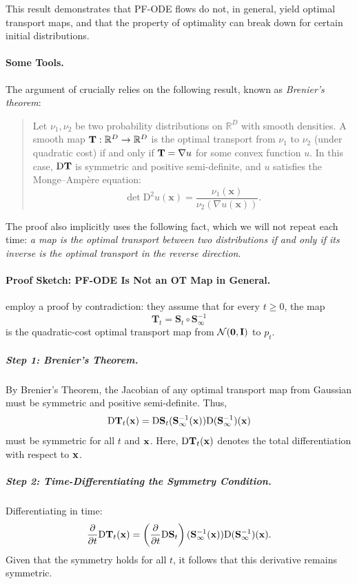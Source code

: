 This result demonstrates that PF-ODE flows do not, in general, yield optimal transport maps, and that the property of optimality can break down for certain initial distributions.

\paragraph{Some Tools.} The argument of \citet{lavenant2022flow} crucially relies on the following result, known as \emph{Brenier's theorem}:
\begin{quote}
    \begin{theorem}\label{thm:brenier}
Let $\nu_1, \nu_2$ be two probability distributions on $\mathbb{R}^D$ with smooth densities. A smooth map ${\mathbf{T}} : \mathbb{R}^D \to \mathbb{R}^D$ is the optimal transport from $\nu_1$ to $\nu_2$ (under quadratic cost) if and only if ${\mathbf{T}} = \nabla u$ for some convex function $u$. In this case, $\mathrm{D} {\mathbf{T}}$ is symmetric and positive semi-definite, and $u$ satisfies the Monge–Ampère equation:
\[
\det \mathrm{D}^2 u(\mathbf{x}) = \frac{\nu_1(\mathbf{x})}{\nu_2(\nabla u(\mathbf{x}))}.
\]
\end{theorem}
\end{quote}

The proof also implicitly uses the following fact, which we will not repeat each time: \emph{a map is the optimal transport between two distributions if and only if its inverse is the optimal transport in the reverse direction}.





\paragraph{Proof Sketch: PF-ODE Is Not an OT Map in General.} \citet{lavenant2022flow} employ a proof by contradiction: they assume that for every $t\ge0$, the map
\[
\mathbf{T}_t  =  \mathbf{S}_t \circ \mathbf{S}_\infty^{-1}
\]
is the quadratic-cost optimal transport map from $\mathcal{N}(\bm{0},{\mathbf{I}})$ to $p_t$. 




\subparagraph{Step 1:  Brenier's Theorem.}  By Brenier’s Theorem, the Jacobian of any optimal transport map from Gaussian must be symmetric and positive semi-definite. Thus, 
\[
\mathrm{D} \mathbf{T}_t({\mathbf{x}}) = \mathrm{D} \mathbf{S}_t(\mathbf{S}_\infty^{-1}({\mathbf{x}})) \mathrm{D} (\mathbf{S}_\infty^{-1})({\mathbf{x}})
\]
must be symmetric for all $t$ and ${\mathbf{x}}$. Here, $\mathrm{D} \mathbf{T}_t({\mathbf{x}})$ denotes the total differentiation with respect to ${\mathbf{x}}$.
\subparagraph{Step 2: Time-Differentiating the Symmetry Condition.}  
Differentiating in time:
\[
\frac{\partial}{\partial t} \mathrm{D}\mathbf{T}_t({\mathbf{x}})
= \left( \frac{\partial}{\partial t} \mathrm{D} \mathbf{S}_t \right)(\mathbf{S}_\infty^{-1}({\mathbf{x}})) \mathrm{D} (\mathbf{S}_\infty^{-1})({\mathbf{x}}).
\]
Given that the symmetry holds for all $t$, it follows that this derivative remains symmetric.

